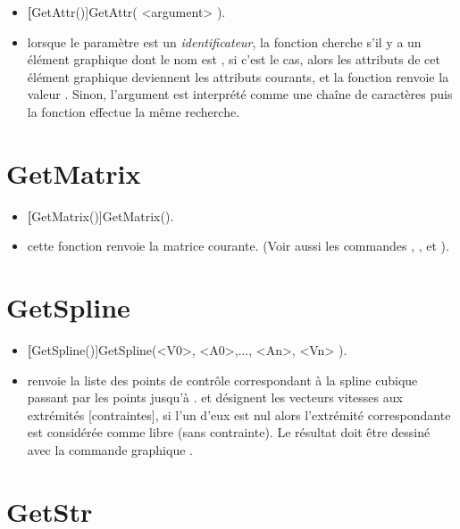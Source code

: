 \begin{itemize}
 \item \util \textbf[GetAttr()]{GetAttr( <argument> )}.
 \item \desc lorsque le paramètre  est un \textit{identificateur}, la fonction cherche s'il y a un élément graphique dont le nom est , si c'est le cas, alors les attributs de cet élément graphique deviennent les attributs courants, et la fonction renvoie la valeur \Nil. Sinon, l'argument est interprété comme une chaîne de caractères puis la fonction effectue la même recherche.
\end{itemize}

\section{GetMatrix}\label{cmdGetMatrix}

\begin{itemize}
 \item \util \textbf[GetMatrix()]{GetMatrix()}.
 \item \desc cette fonction renvoie la matrice courante. (Voir aussi les commandes , , et ).
\end{itemize} 

\section{GetSpline}\label{cmdGetSpline}

\begin{itemize}
 \item \util \textbf[GetSpline()]{GetSpline(<V0>, <A0>,..., <An>, <Vn> )}.
 \item \desc renvoie la liste des points de contrôle correspondant à la spline cubique passant par les points  jusqu'à .  et  désignent les vecteurs vitesses aux extrémités [contraintes], si l'un d'eux est nul alors l'extrémité correspondante est considérée comme libre (sans contrainte). Le résultat doit être dessiné avec la commande graphique .
\end{itemize}

\section{GetStr}\label{cmdGetStr}


